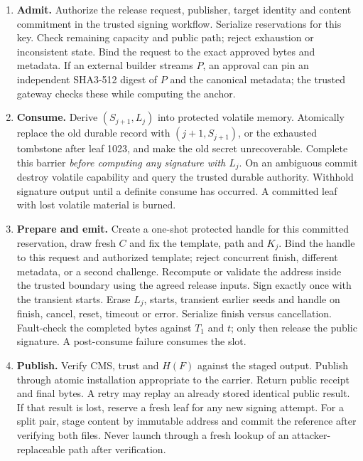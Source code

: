 \documentclass[10pt,twocolumn,letterpaper]{article}
\begin{document}
\begin{enumerate}
\item \textbf{Admit.} Authorize the release request, publisher, target identity and content commitment in the trusted signing workflow. Serialize reservations for this key. Check remaining capacity and public path; reject exhaustion or inconsistent state. Bind the request to the exact approved bytes and metadata. If an external builder streams $P$, an approval can pin an independent SHA3-512 digest of $P$ and the canonical metadata; the trusted gateway checks these while computing the anchor.
\item \textbf{Consume.} Derive $(S_{j+1},L_j)$ into protected volatile memory. Atomically replace the old durable record with $(j+1,S_{j+1})$, or the exhausted tombstone after leaf 1023, and make the old secret unrecoverable. Complete this barrier \emph{before computing any signature with $L_j$}. On an ambiguous commit destroy volatile capability and query the trusted durable authority. Withhold signature output until a definite consume has occurred. A committed leaf with lost volatile material is burned.
\item \textbf{Prepare and emit.} Create a one-shot protected handle for this committed reservation, draw fresh $C$ and fix the template, path and $K_j$. Bind the handle to this request and authorized template; reject concurrent finish, different metadata, or a second challenge. Recompute or validate the address inside the trusted boundary using the agreed release inputs. Sign exactly once with the transient starts. Erase $L_j$, starts, transient earlier seeds and handle on finish, cancel, reset, timeout or error. Serialize finish versus cancellation. Fault-check the completed bytes against $T_1$ and $t$; only then release the public signature. A post-consume failure consumes the slot.
\item \textbf{Publish.} Verify CMS, trust and $H(F)$ against the staged output. Publish through atomic installation appropriate to the carrier. Return public receipt and final bytes. A retry may replay an already stored identical public result. If that result is lost, reserve a fresh leaf for any new signing attempt. For a split pair, stage content by immutable address and commit the reference after verifying both files. Never launch through a fresh lookup of an attacker-replaceable path after verification.
\end{enumerate}
\end{document}
